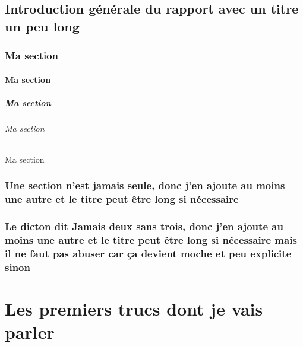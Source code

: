 \documentclass[bare]{polytech/polytech}
\begin{document}
             
\chapter*[Titre court pour l'entête]{Introduction générale du rapport avec un titre un peu long}

\lipsum[1-5]
\section{Ma section}

\lipsum[1-3]

\subsection{Ma section}

\lipsum[1-3]

\subsubsection{Ma section}

\lipsum[1-3]

\paragraph{Ma section}

\lipsum[1-3]

\subparagraph{Ma section}

\lipsum[1-3]

\section{Une section n'est jamais seule, donc j'en ajoute au moins une autre et le titre peut être long si nécessaire}

\lipsum[1-3]
                       
\section{Le dicton dit \og{}Jamais deux sans trois\fg{}, donc j'en ajoute au moins une autre et le titre peut être long si nécessaire mais il ne faut pas abuser car ça devient moche et peu explicite sinon}

\lipsum[1-3] 

\part{Les premiers trucs dont je vais parler}                
\end{document}
